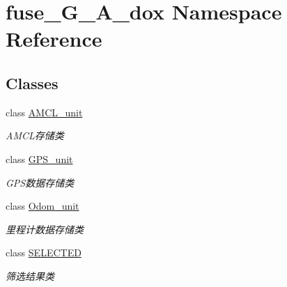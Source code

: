 \hypertarget{namespacefuse___g___a__dox}{}\section{fuse\+\_\+\+G\+\_\+\+A\+\_\+dox Namespace Reference}
\label{namespacefuse___g___a__dox}
\subsection*{Classes}
\begin{DoxyCompactItemize}
\item 
class \hyperlink{classfuse___g___a__dox_1_1_a_m_c_l__unit}{A\+M\+C\+L\+\_\+unit}
\begin{DoxyCompactList}\small\item\em A\+M\+C\+L存储类 \end{DoxyCompactList}\item 
class \hyperlink{classfuse___g___a__dox_1_1_g_p_s__unit}{G\+P\+S\+\_\+unit}
\begin{DoxyCompactList}\small\item\em G\+P\+S数据存储类 \end{DoxyCompactList}\item 
class \hyperlink{classfuse___g___a__dox_1_1_odom__unit}{Odom\+\_\+unit}
\begin{DoxyCompactList}\small\item\em 里程计数据存储类 \end{DoxyCompactList}\item 
class \hyperlink{classfuse___g___a__dox_1_1_s_e_l_e_c_t_e_d}{S\+E\+L\+E\+C\+T\+ED}
\begin{DoxyCompactList}\small\item\em 筛选结果类 \end{DoxyCompactList}\end{DoxyCompactItemize}
